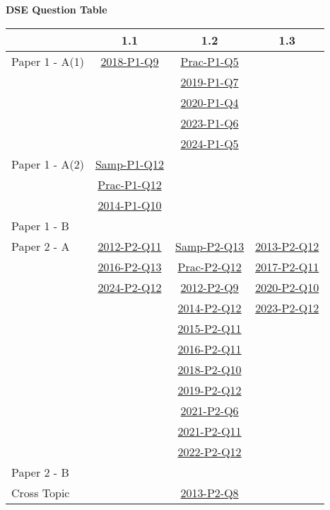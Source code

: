 \documentclass[12pt, a4paper]{article}
\begin{document}
\begin{absolutelynopagebreak}
\begin{center}
\textbf{DSE Question Table}
\end{center}
\begin{center}
\begin{tabular}{|l|c|c|c|}
\hline
        & 1.1 & 1.2 & 1.3 \\\hline
\hline
Paper 1 - A(1)& \hyperref[DSE2018-CoreP1-Q09]{2018-P1-Q9} & \hyperref[DSE2012P-CoreP1-Q05]{Prac-P1-Q5} &  \\
&  & \hyperref[DSE2019-CoreP1-Q07]{2019-P1-Q7} &  \\
&  & \hyperref[DSE2020-CoreP1-Q04]{2020-P1-Q4} &  \\
&  & \hyperref[DSE2023-CoreP1-Q06]{2023-P1-Q6} &  \\
&  & \hyperref[DSE2024-CoreP1-Q05]{2024-P1-Q5} &  \\
\hline
Paper 1 - A(2)& \hyperref[DSE2012S-CoreP1-Q12]{Samp-P1-Q12} &  &  \\
& \hyperref[DSE2012P-CoreP1-Q12]{Prac-P1-Q12} &  &  \\
& \hyperref[DSE2014-CoreP1-Q10]{2014-P1-Q10} &  &  \\
\hline
Paper 1 - B&  &  &  \\
\hline
\hline
Paper 2 - A& \hyperref[DSE2012-CoreP2-Q11]{2012-P2-Q11} & \hyperref[DSE2012S-CoreP2-Q13]{Samp-P2-Q13} & \hyperref[DSE2013-CoreP2-Q12]{2013-P2-Q12} \\
& \hyperref[DSE2016-CoreP2-Q13]{2016-P2-Q13} & \hyperref[DSE2012P-CoreP2-Q12]{Prac-P2-Q12} & \hyperref[DSE2017-CoreP2-Q11]{2017-P2-Q11} \\
& \hyperref[DSE2024-CoreP2-Q12]{2024-P2-Q12} & \hyperref[DSE2012-CoreP2-Q09]{2012-P2-Q9} & \hyperref[DSE2020-CoreP2-Q10]{2020-P2-Q10} \\
&  & \hyperref[DSE2014-CoreP2-Q12]{2014-P2-Q12} & \hyperref[DSE2023-CoreP2-Q12]{2023-P2-Q12} \\
&  & \hyperref[DSE2015-CoreP2-Q11]{2015-P2-Q11} &  \\
&  & \hyperref[DSE2016-CoreP2-Q11]{2016-P2-Q11} &  \\
&  & \hyperref[DSE2018-CoreP2-Q10]{2018-P2-Q10} &  \\
&  & \hyperref[DSE2019-CoreP2-Q12]{2019-P2-Q12} &  \\
&  & \hyperref[DSE2021-CoreP2-Q06]{2021-P2-Q6} &  \\
&  & \hyperref[DSE2021-CoreP2-Q11]{2021-P2-Q11} &  \\
&  & \hyperref[DSE2022-CoreP2-Q12]{2022-P2-Q12} &  \\
\hline
Paper 2 - B&  &  &  \\
\hline
\hline
Cross Topic&  & \hyperref[DSE2013-CoreP2-Q08]{2013-P2-Q8} &  \\
\hline
\end{tabular}
\end{center}
\end{absolutelynopagebreak}
\end{document}
